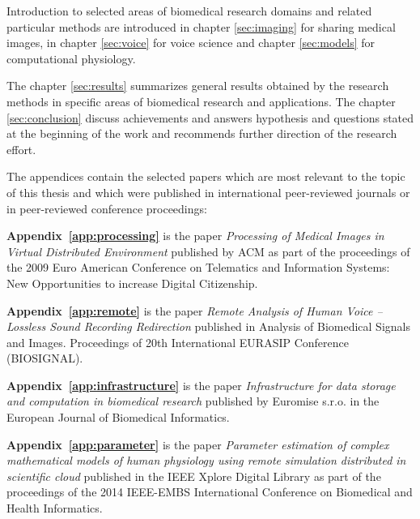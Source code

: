
Introduction to selected areas of biomedical research domains and related particular methods are introduced in chapter \ref{sec:imaging} for sharing medical images, in chapter \ref{sec:voice} for voice science and chapter \ref{sec:models} for computational physiology.

The chapter \ref{sec:results} summarizes general results obtained by the research methods in specific areas of biomedical research and applications. The chapter \ref{sec:conclusion} discuss achievements and answers hypothesis and questions stated at the beginning of the work and recommends further direction of the research effort.

The appendices contain the selected papers \cite{kulhanek2009,kulhanek2010b,kulhanek2010c,Kulhanek2014Parameters, Kulhanek2014Modeling, Kulhanek2014mefanet, Matejak2014sj} which are most relevant to the topic of this thesis and which were published in international peer-reviewed journals or in peer-reviewed conference proceedings:

\textbf{Appendix~\ref{app:processing}} is the paper \cite{kulhanek2009} \emph{Processing of Medical Images in Virtual Distributed Environment} published by ACM as part of the proceedings of the 2009 Euro American Conference on Telematics and Information Systems: New Opportunities to increase Digital Citizenship.

\textbf{Appendix~\ref{app:remote}} is the paper \cite{kulhanek2010b} \emph{Remote Analysis of Human Voice – Lossless Sound Recording Redirection} published in Analysis of Biomedical Signals and Images. Proceedings of 20th International EURASIP Conference (BIOSIGNAL).


\textbf{Appendix~\ref{app:infrastructure}} is the paper \cite{kulhanek2010c} \emph{Infrastructure for data storage and computation in biomedical research} published by Euromise s.r.o. in the European Journal of Biomedical Informatics.

\textbf{Appendix~\ref{app:parameter}} is the paper \cite{Kulhanek2014Parameters} \emph{Parameter estimation of complex mathematical models of human physiology using remote simulation distributed in scientific cloud} published in the IEEE Xplore Digital Library as part of the proceedings of the 2014 IEEE-EMBS International Conference on Biomedical and Health Informatics.

